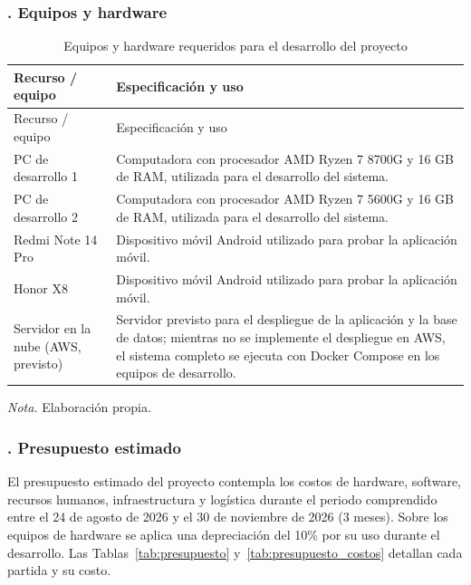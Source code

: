 \subsubsection{. Equipos y hardware}\label{sec:recursos_hardware}

\begin{longtable}{>{\raggedright\arraybackslash}p{4.5cm} >{\raggedright\arraybackslash}p{8.5cm}}
\caption{Equipos y hardware requeridos para el desarrollo del proyecto}\label{tab:equipos_hardware}\\
\toprule
Recurso / equipo & Especificación y uso \\
\midrule
\endfirsthead
\toprule
Recurso / equipo & Especificación y uso \\
\midrule
\endhead
\bottomrule
\endfoot
PC de desarrollo 1 & Computadora con procesador AMD Ryzen 7 8700G y 16 GB de RAM, utilizada para el desarrollo del sistema. \\
PC de desarrollo 2 & Computadora con procesador AMD Ryzen 7 5600G y 16 GB de RAM, utilizada para el desarrollo del sistema. \\
Redmi Note 14 Pro & Dispositivo móvil Android utilizado para probar la aplicación móvil. \\
Honor X8 & Dispositivo móvil Android utilizado para probar la aplicación móvil. \\
Servidor en la nube (AWS, previsto) & Servidor previsto para el despliegue de la aplicación y la base de datos; mientras no se implemente el despliegue en AWS, el sistema completo se ejecuta con Docker Compose en los equipos de desarrollo. \\
\bottomrule
\end{longtable}
\noindent\textit{Nota.} Elaboración propia.


\subsubsection{. Presupuesto estimado}\label{sec:presupuesto_estimado}

El presupuesto estimado del proyecto contempla los costos de hardware, software, recursos humanos, infraestructura y logística durante el periodo comprendido entre el 24 de agosto de 2026 y el 30 de noviembre de 2026 (3 meses). Sobre los equipos de hardware se aplica una depreciación del 10\% por su uso durante el desarrollo. Las Tablas~\ref{tab:presupuesto} y~\ref{tab:presupuesto_costos} detallan cada partida y su costo.

